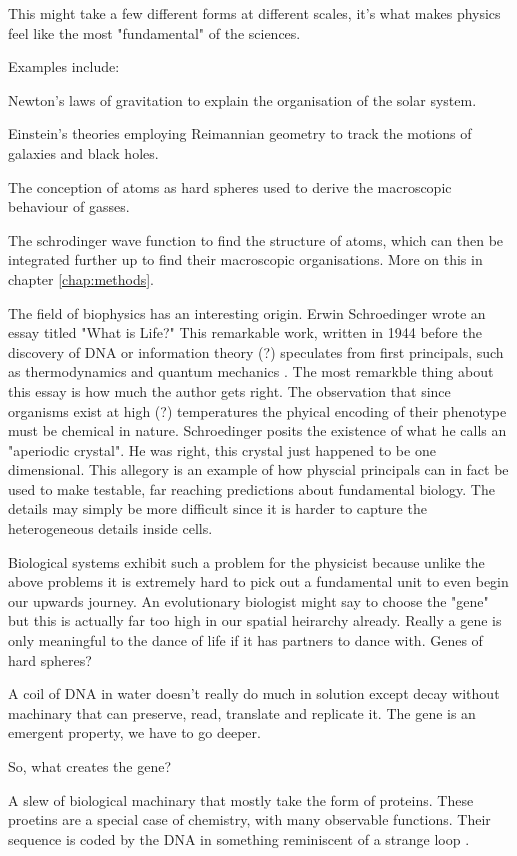 This might take a few different forms at different scales, it's what makes physics feel like the most "fundamental" of the sciences. 

Examples include:

Newton's laws of gravitation to explain the organisation of the solar system. 

Einstein's theories employing Reimannian geometry to track the motions of galaxies and black holes.

The conception of atoms as hard spheres used to derive the macroscopic behaviour of gasses.

The schrodinger wave function to find the structure of atoms, which can then be integrated further up to find their macroscopic organisations. More on this in chapter \ref{chap:methods}.

The field of biophysics has an interesting origin. Erwin Schroedinger wrote an essay titled "What is Life?" This remarkable work, written in  1944 before the discovery of DNA or information theory (?) speculates from first principals, such as thermodynamics and quantum mechanics . The most remarkble thing about this essay is how much the author gets right. The observation that since organisms exist at high (?) temperatures the phyical encoding of their phenotype must be chemical in nature. Schroedinger posits the existence of what he  calls an "aperiodic crystal". He was right, this crystal just happened to be one dimensional. This allegory is an example of how physcial principals can in fact be used to make testable, far reaching predictions about fundamental biology. The details may simply be more difficult since it is harder to capture the heterogeneous details inside cells.

Biological systems exhibit such a problem for the physicist because unlike the above problems it is extremely hard to pick out a fundamental unit to even begin our upwards journey. An evolutionary biologist might say to choose the "gene" but this is actually far too high in our spatial heirarchy already. Really a gene is only meaningful to the dance of life if it has partners to dance with. Genes of hard spheres?

A coil of DNA in water doesn't really do much in solution except decay without machinary that can preserve, read, translate and replicate it. The gene is an emergent property, we have to go deeper. 

So, what creates the gene? 

A slew of biological machinary that mostly take the form of proteins. These proetins are a special case of chemistry, with many observable functions. Their sequence is  coded by the DNA in something reminiscent of a strange loop \cite{hofstadter2007}. 


